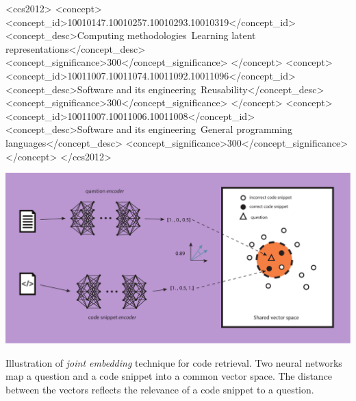 \documentclass[sigconf]{acmart}
\begin{document}
\begin{CCSXML}
<ccs2012>
   <concept>
       <concept_id>10010147.10010257.10010293.10010319</concept_id>
       <concept_desc>Computing methodologies~Learning latent representations</concept_desc>
       <concept_significance>300</concept_significance>
       </concept>
   <concept>
       <concept_id>10011007.10011074.10011092.10011096</concept_id>
       <concept_desc>Software and its engineering~Reusability</concept_desc>
       <concept_significance>300</concept_significance>
       </concept>
   <concept>
       <concept_id>10011007.10011006.10011008</concept_id>
       <concept_desc>Software and its engineering~General programming languages</concept_desc>
       <concept_significance>300</concept_significance>
       </concept>
 </ccs2012>
\end{CCSXML}




\begin{teaserfigure}
  \includegraphics[width=\textwidth]{figuras/joint_embedding-article.pdf}
  \caption{Illustration of \emph{joint embedding} technique for code retrieval. Two neural networks map a question and a code snippet into a common vector space. The distance between the vectors reflects the relevance of a code snippet to a question.}
  \label{fig:joint-embedding}
\end{teaserfigure}
\end{document}
